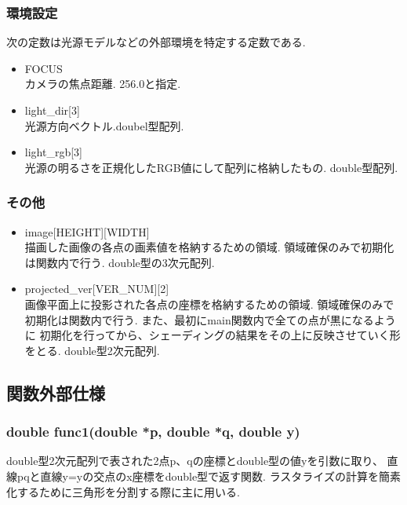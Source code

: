 \documentclass[a4j,dvipdfmx]{jsarticle}
\begin{document}
\subsubsection{環境設定}
次の定数は光源モデルなどの外部環境を特定する定数である.
\begin{itemize}
\item FOCUS\\
  カメラの焦点距離. 256.0と指定.
  
\item light\_dir[3]\\
  光源方向ベクトル.doubel型配列.
  
\item light\_rgb[3]\\
  光源の明るさを正規化したRGB値にして配列に格納したもの.
  double型配列.
  
\end{itemize}

\subsubsection{その他}
\begin{itemize}
\item image[HEIGHT][WIDTH]\\
  描画した画像の各点の画素値を格納するための領域.
  領域確保のみで初期化は関数内で行う.
  double型の3次元配列.
  
\item projected\_ver[VER\_NUM][2]\\
  画像平面上に投影された各点の座標を格納するための領域.
  領域確保のみで初期化は関数内で行う.
  また、最初にmain関数内で全ての点が黒になるように
  初期化を行ってから、シェーディングの結果をその上に反映させていく形をとる.
  double型2次元配列.
\end{itemize}


\subsection{関数外部仕様}
\subsubsection{double func1(double *p, double *q, double y)}
double型2次元配列で表された2点p、qの座標とdouble型の値yを引数に取り、
直線pqと直線y=yの交点のx座標をdouble型で返す関数.
ラスタライズの計算を簡素化するために三角形を分割する際に主に用いる.
\end{document}
